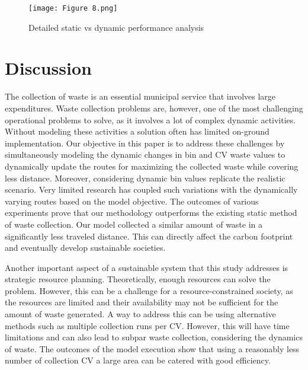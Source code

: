 \documentclass[12pt]{article}
\begin{document}
\begin{figure}[H]
	\centering
	\texttt{[image: Figure 8.png]}\label{ABCD}
	\caption{Detailed static vs dynamic performance analysis}\label{figcg1}
\end{figure}

\section{Discussion}

The collection of waste is an essential municipal service that involves large expenditures. Waste collection problems are, however, one of the most challenging operational problems to solve, as it involves a lot of complex dynamic activities. Without modeling these activities a solution often has limited on-ground implementation. Our objective in this paper is to address these challenges by simultaneously modeling the dynamic changes in bin and CV waste values to dynamically update the routes for maximizing the collected waste while covering less distance. Moreover, considering dynamic bin values replicate the realistic scenario. Very limited research has coupled such variations with the dynamically varying routes based on the model objective. The outcomes of various experiments prove that our methodology outperforms the existing static method of waste collection. Our model collected a similar amount of waste in a significantly less traveled distance. This can directly affect the carbon footprint and eventually develop sustainable societies.

Another important aspect of a sustainable system that this study addresses is strategic resource planning. Theoretically, enough resources can solve the problem. However, this can be a challenge for a resource-constrained society, as the resources are limited and their availability may not be sufficient for the amount of waste generated. A way to address this can be using alternative methods such as multiple collection runs per CV. However, this will have time limitations and can also lead to subpar waste collection, considering the dynamics of waste. The outcomes of the model execution show that using a reasonably less number of collection CV a large area can be catered with good efficiency.
\end{document}
